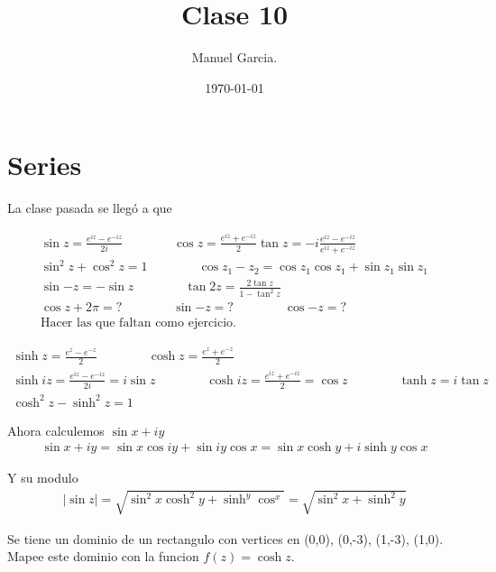 \documentclass{article}
\title{Clase 10}
\author{Manuel Garcia.}
\date{\today}
\newcommand{\caja}[3]{%
  \begin{tcolorbox}[colback=#1!5!white,colframe=#1!25!black,title=#2]
    #3
  \end{tcolorbox}%
}
\begin{document}
\maketitle

\section{Series}
La clase pasada se llegó a que 
\caja{red}{Trigonometricas }{
  \begin{gather*}
    \sin{z } = \frac{e ^ {i z }- e ^ {-iz }}{2i }\qquad \qquad \cos{z } = \frac{e ^ {iz } + e ^ {-iz }}{2}
    \tan{z } = -i \frac{e ^ {i z }- e ^ {-i z }}{e ^ {i z } + e ^ {-iz }}\\
    \sin^2{z} +\cos^2{z} = 1\qquad \qquad \cos{z_1-z_2} = \cos{z_1 }\cos{z_1 } + \sin{z_1 }\sin{z_1 }\\
    \sin{-z } = - \sin{z } \qquad \qquad \tan{2z } = \frac{2 \tan{z}}{1-\tan^2{z}}\\
    \cos{z+2\pi} = ?\qquad \qquad \sin{-z } = ? \qquad \qquad \cos{-z } = ?\\
    \text{Hacer las que faltan como ejercicio.}
  \end{gather*}
}
\caja{red}{Hiperbolicas }{
  \begin{gather*}
    \sinh{z } = \displaystyle\frac{e ^ {z }- e ^ {-z }}{2 }\qquad \qquad \cosh{z} = \displaystyle\frac{e ^ {z } + e ^ {-z }}{2 }\\
    \sinh{iz } = \frac{e ^ {iz } - e ^ {-iz }}{2i }= i \sin{z } \qquad \qquad \cosh{iz } = \frac{e ^ {iz } + e ^ {-iz }}{2} = \cos{z }
    \qquad \qquad \tanh{z } = i \tan{z }\\
    \cosh^2 z - \sinh^2 z  = 1
  \end{gather*} 
}

Ahora calculemos $ \sin{x + i y } $
\begin{gather*}
  \sin{x + i y } = \sin{x }\cos{iy } + \sin{iy }\cos{x } = \sin{x}\cosh{y} + i \sinh{y }\cos{x }
\end{gather*}

Y su modulo 
\begin{gather*}
  \left|\sin{z }\right| = \sqrt{\sin^2{x}\cosh^2{y} +  \sinh^{y }\cos^{x }} = \sqrt{\sin^2 x + \sinh^2 y}   
\end{gather*}

\hfill 

\hfill 

Se tiene un dominio de un rectangulo con vertices en (0,0), (0,-3), (1,-3), (1,0). Mapee este dominio con la funcion $ f\left(z\right)= \cosh{z } $.
\end{document}
